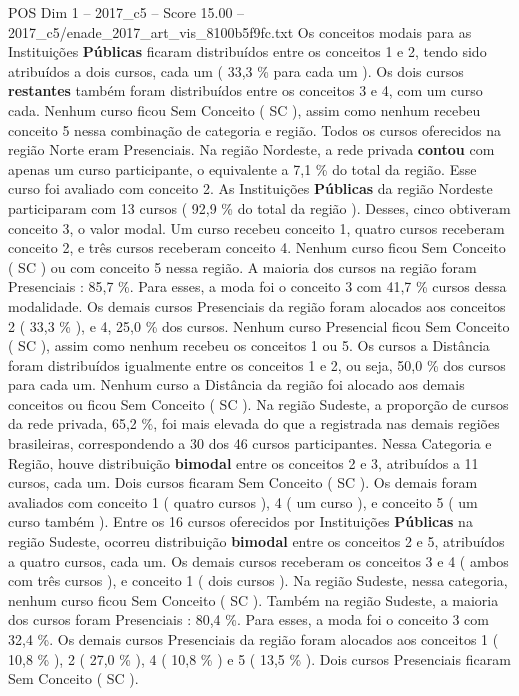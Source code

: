 \begin{textsample}{POS Dim 1 – 2017\_c5 – Score 15.00 – 2017\_c5/enade\_2017\_art\_vis\_8100b5f9fc.txt}
Os conceitos modais para as Instituições \textbf{Públicas} ficaram distribuídos entre os conceitos 1 e 2, tendo sido atribuídos a dois cursos, cada um ( 33,3 \% para cada um ).
Os dois cursos \textbf{restantes} também foram distribuídos entre os conceitos 3 e 4, com um curso cada.
Nenhum curso ficou Sem Conceito ( SC ), assim como nenhum recebeu conceito 5 nessa combinação de categoria e região.
Todos os cursos oferecidos na região Norte eram Presenciais.
Na região Nordeste, a rede privada \textbf{contou} com apenas um curso participante, o equivalente a 7,1 \% do total da região.
Esse curso foi avaliado com conceito 2.
As Instituições \textbf{Públicas} da região Nordeste participaram com 13 cursos ( 92,9 \% do total da região ).
Desses, cinco obtiveram conceito 3, o valor modal.
Um curso recebeu conceito 1, quatro cursos receberam conceito 2, e três cursos receberam conceito 4.
Nenhum curso ficou Sem Conceito ( SC ) ou com conceito 5 nessa região.
A maioria dos cursos na região foram Presenciais : 85,7 \%.
Para esses, a moda foi o conceito 3 com 41,7 \% cursos dessa modalidade.
Os demais cursos Presenciais da região foram alocados aos conceitos 2 ( 33,3 \% ), e 4, 25,0 \% dos cursos.
Nenhum curso Presencial ficou Sem Conceito ( SC ), assim como nenhum recebeu os conceitos 1 ou 5.
Os cursos a Distância foram distribuídos igualmente entre os conceitos 1 e 2, ou seja, 50,0 \% dos cursos para cada um.
Nenhum curso a Distância da região foi alocado aos demais conceitos ou ficou Sem Conceito ( SC ).
Na região Sudeste, a proporção de cursos da rede privada, 65,2 \%, foi mais elevada do que a registrada nas demais regiões brasileiras, correspondendo a 30 dos 46 cursos participantes.
Nessa Categoria e Região, houve distribuição \textbf{bimodal} entre os conceitos 2 e 3, atribuídos a 11 cursos, cada um.
Dois cursos ficaram Sem Conceito ( SC ).
Os demais foram avaliados com conceito 1 ( quatro cursos ), 4 ( um curso ), e conceito 5 ( um curso também ).
Entre os 16 cursos oferecidos por Instituições \textbf{Públicas} na região Sudeste, ocorreu distribuição \textbf{bimodal} entre os conceitos 2 e 5, atribuídos a quatro cursos, cada um.
Os demais cursos receberam os conceitos 3 e 4 ( ambos com três cursos ), e conceito 1 ( dois cursos ).
Na região Sudeste, nessa categoria, nenhum curso ficou Sem Conceito ( SC ).
Também na região Sudeste, a maioria dos cursos foram Presenciais : 80,4 \%.
Para esses, a moda foi o conceito 3 com 32,4 \%.
Os demais cursos Presenciais da região foram alocados aos conceitos 1 ( 10,8 \% ), 2 ( 27,0 \% ), 4 ( 10,8 \% ) e 5 ( 13,5 \% ).
Dois cursos Presenciais ficaram Sem Conceito ( SC ).

\end{textsample}
